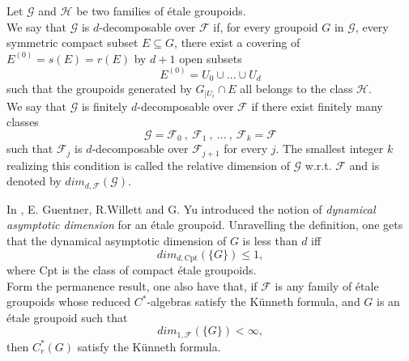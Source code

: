\begin{definition}
Let $\mathcal G$ and $\mathcal H$ be two families of \'etale groupoids. \\

We say that $\mathcal G$ is $d$-decomposable over $\mathcal F$ if, for every groupoid $G$ in $\mathcal G$, every symmetric compact subset $E\subseteq G$, there exist a covering of $E^{(0)} = s(E)=r(E)$ by $d+1$ open subsets 
\[E^{(0)} = U_0 \cup ... \cup U_d \] such that the groupoids generated by $G_{|U_i} \cap E$ all belongs to the class $\mathcal H$.\\

We say that $\mathcal G$ is finitely $d$-decomposable over $\mathcal F$ if there exist finitely many classes 
\[\mathcal G= \mathcal F_0 \ , \ \mathcal F_1 \ , \ ... \ , \ \mathcal F_k = \mathcal F \] 
such that $\mathcal F_j$ is $d$-decomposable over $\mathcal F_{j+1}$ for every $j$. The smallest integer $k$ realizing this condition is called the relative dimension of $\mathcal G$ w.r.t. $\mathcal F$ and is denoted by $dim_{d,\mathcal F}(\mathcal G)$.  
\end{definition}

In \cite{GWY}, E. Guentner, R.Willett and G. Yu introduced the notion of \textit{dynamical asymptotic dimension} for an \'etale groupoid. Unravelling the definition, one gets that the dynamical asymptotic dimension of $G$ is less than $d$ iff \[dim_{d,\text{Cpt}} (\{G\}) \leq 1,\]
where Cpt is the class of compact \'etale groupoids.\\

Form the permanence result, one also have that, if $\mathcal F$ is any family of \'etale groupoids whose reduced $C^*$-algebras satisfy the Künneth formula, and $G$ is an \'etale groupoid such that \[dim_{1, \mathcal F} ( \{G\} ) < \infty, \]
then $C_r^*(G)$ satisfy the Künneth formula.\\  
































